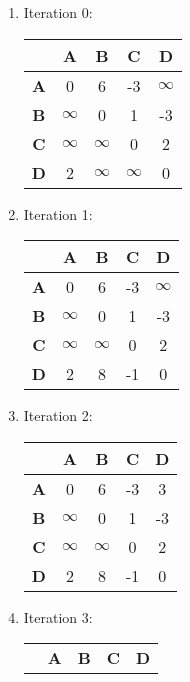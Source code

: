 \documentclass{article}
\begin{document}
\begin{enumerate}
    \begin{enumerate}
        \item Iteration 0:
        \begin{tabular}{|c|c|c|c|c|}
            \hline
            & \textbf{A} & \textbf{B} & \textbf{C} & \textbf{D} \\
            \hline
            \textbf{A} & 0 & 6 & -3 & $\infty$ \\
            \hline
            \textbf{B} & $\infty$ & 0 & 1 & -3 \\
            \hline
            \textbf{C} & $\infty$ & $\infty$ & 0 & 2 \\
            \hline
            \textbf{D} & 2 & $\infty$ & $\infty$ & 0 \\
            \hline
        \end{tabular}
        \item Iteration 1:
        \begin{tabular}{|c|c|c|c|c|}
            \hline
            & \textbf{A} & \textbf{B} & \textbf{C} & \textbf{D} \\
            \hline
            \textbf{A} & 0 & 6 & -3 & $\infty$ \\
            \hline
            \textbf{B} & $\infty$ & 0 & 1 & -3 \\
            \hline
            \textbf{C} & $\infty$ & $\infty$ & 0 & 2 \\
            \hline
            \textbf{D} & 2 & 8 & -1 & 0 \\
            \hline
        \end{tabular}
        \item Iteration 2:
        \begin{tabular}{|c|c|c|c|c|}
            \hline
            & \textbf{A} & \textbf{B} & \textbf{C} & \textbf{D} \\
            \hline
            \textbf{A} & 0 & 6 & -3 & 3 \\
            \hline
            \textbf{B} & $\infty$ & 0 & 1 & -3 \\
            \hline
            \textbf{C} & $\infty$ & $\infty$ & 0 & 2 \\
            \hline
            \textbf{D} & 2 & 8 & -1 & 0 \\
            \hline
        \end{tabular}
        \item Iteration 3:
        \begin{tabular}{|c|c|c|c|c|}
            \hline
            & \textbf{A} & \textbf{B} & \textbf{C} & \textbf{D} \\

\end{tabular}
\end{enumerate}
\end{enumerate}
\end{document}

